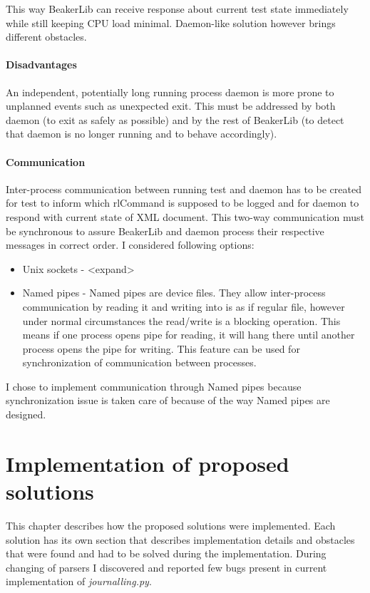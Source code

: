 This way BeakerLib can receive response about current test state immediately while still keeping CPU load minimal. Daemon-like solution however brings different obstacles.

\subsubsection{Disadvantages}
An independent, potentially long running process daemon is more prone to unplanned events such as unexpected exit. This must be addressed by both daemon (to exit as safely as possible)  and by the rest of BeakerLib (to detect that daemon is no longer running and to behave accordingly). 

\subsubsection{Communication}
Inter-process communication between running test and daemon has to be created for test to inform which rlCommand is supposed to be logged and for daemon to respond with current state of XML document. This two-way communication must be synchronous to assure BeakerLib and daemon process their respective messages in correct order. I considered following options:

\begin{itemize}
\item Unix sockets  -  <expand>
\item Named pipes - Named pipes are device files. They allow inter-process communication by reading it and writing into is as if regular file, however under normal circumstances the read/write is a blocking operation\cite{pipes_blocking}. This means if one process opens pipe for reading, it will hang there until another process opens the pipe for writing. This feature can be used for synchronization of communication between processes. 
\end{itemize}


I chose to implement communication through Named pipes because synchronization issue is taken care of because of the way Named pipes are designed.


\chapter{Implementation of proposed solutions}
\label{implementations}
This chapter describes how the proposed solutions were implemented. Each solution has its own section that describes implementation details and obstacles that were found and had to be solved during the implementation.
During changing of parsers I discovered and reported few bugs present in current implementation of \textit{journalling.py}.

